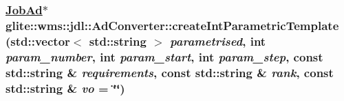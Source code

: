 \hypertarget{classglite_1_1wms_1_1jdl_1_1AdConverter_z21_3}{
\subsubsection[createIntParametricTemplate]{\setlength{\rightskip}{0pt plus 5cm}\hyperlink{classglite_1_1wms_1_1jdl_1_1JobAd}{Job\-Ad}$\ast$ glite::wms::jdl::Ad\-Converter::create\-Int\-Parametric\-Template (std::vector$<$ std::string $>$ {\em parametrised}, int {\em param\_\-number}, int {\em param\_\-start}, int {\em param\_\-step}, const std::string \& {\em requirements}, const std::string \& {\em rank}, const std::string \& {\em vo} = \char`\"{}\char`\"{})}}
\label{classglite_1_1wms_1_1jdl_1_1AdConverter_z21_3}


